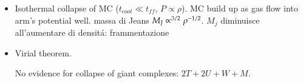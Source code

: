 \documentclass[main.tex]{subfiles}
\begin{document}
\begin{itemize}
\item Isothermal collapse of MC ($t_{cool}\ll t_{ff}$, $P\propto\rho$). MC build up as gas flow into arm's potential well. massa di Jeans $M_J\propto^{3/2}\rho^{-1/2}$. $M_j$ diminuisce all'aumentare di densit\'a: frammentazione
\item Virial theorem.






No evidence for collapse of giant complexes: $2T+2U+W+M$.





\end{itemize}
\end{document}
